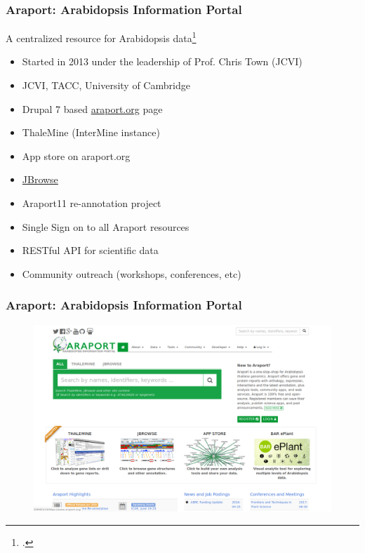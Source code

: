 \documentclass{beamer}
\begin{document}
\begin{frame}
    \frametitle{Araport: Arabidopsis Information Portal}
    A centralized resource for Arabidopsis data\footcite{araport2015}
    \begin{itemize}
        \item Started in 2013 under the leadership of Prof. Chris Town (JCVI)
        \item JCVI, TACC, University of Cambridge
        \item Drupal 7 based \href{http://araport.org}{araport.org} page
        \item ThaleMine (InterMine instance)
        \item App store on araport.org
        \item \href{https://apps.araport.org/jbrowse/?data=arabidopsis}{JBrowse}
        \item Araport11 re-annotation project
        \item Single Sign on to all Araport resources
        \item RESTful API for scientific data
        \item Community outreach (workshops, conferences, etc)
    \end{itemize}
\end{frame}

\begin{frame}
    \frametitle{Araport: Arabidopsis Information Portal}
    \begin{figure}[H]
        \centering
        \includegraphics[width=\columnwidth]{img/Araport2017.png}
    \end{figure}
\end{frame}
\end{document}
